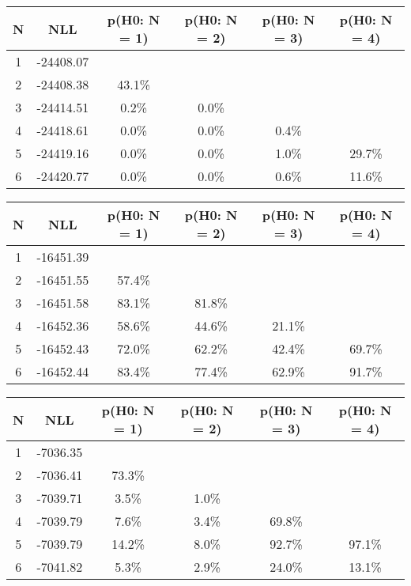 \begin{table}[htb]
	\begin{center}
{\footnotesize\renewcommand{\arraystretch}{1.4}
		\begin{tabular}{cc||cccc}
			N & NLL & p(H0: N = 1) & p(H0: N = 2) & p(H0: N = 3) & p(H0: N = 4)\\ 
		\hline
1 & -24408.07 & & & & \\
2 & -24408.38 & 43.1\% & & & \\
3 & -24414.51 & 0.2\% & 0.0\% & & \\
4 & -24418.61 & 0.0\% & 0.0\% & 0.4\% & \\
5 & -24419.16 & 0.0\% & 0.0\% & 1.0\% & 29.7\% \\
6 & -24420.77 & 0.0\% & 0.0\% & 0.6\% & 11.6\% \\
	\end{tabular}
		\label{tab:lab}
	}
	\end{center}\end{table}

\begin{table}[htb]
	\begin{center}
{\footnotesize\renewcommand{\arraystretch}{1.4}
		\begin{tabular}{cc||cccc}
			N & NLL & p(H0: N = 1) & p(H0: N = 2) & p(H0: N = 3) & p(H0: N = 4)\\ 
		\hline
1 & -16451.39 & & & & \\
2 & -16451.55 & 57.4\% & & & \\
3 & -16451.58 & 83.1\% & 81.8\% & & \\
4 & -16452.36 & 58.6\% & 44.6\% & 21.1\% & \\
5 & -16452.43 & 72.0\% & 62.2\% & 42.4\% & 69.7\% \\
6 & -16452.44 & 83.4\% & 77.4\% & 62.9\% & 91.7\% \\
	\end{tabular}
		\label{tab:lab}
	}
	\end{center}\end{table}

\begin{table}[htb]
	\begin{center}
{\footnotesize\renewcommand{\arraystretch}{1.4}
		\begin{tabular}{cc||cccc}
			N & NLL & p(H0: N = 1) & p(H0: N = 2) & p(H0: N = 3) & p(H0: N = 4)\\ 
		\hline
1 & -7036.35 & & & & \\
2 & -7036.41 & 73.3\% & & & \\
3 & -7039.71 & 3.5\% & 1.0\% & & \\
4 & -7039.79 & 7.6\% & 3.4\% & 69.8\% & \\
5 & -7039.79 & 14.2\% & 8.0\% & 92.7\% & 97.1\% \\
6 & -7041.82 & 5.3\% & 2.9\% & 24.0\% & 13.1\% \\
	\end{tabular}
		\label{tab:lab}
	}
	\end{center}\end{table}

